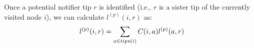 \documentclass[a4paper,10pt]{article}
\begin{document}
Once a potential notifier tip $r$ is identified (i.e., $r$ is a sister tip of the currently visited node $i$), we can calculate $l^{(p)}(i, r)$ as:
\begin{equation}
\scriptsize 
l^{(p)}(i, r) = \sum\limits_{a \in tips(i)}C(i, a) l^{(p)}(a, r)
\end{equation}




%
%
%
\end{document}
